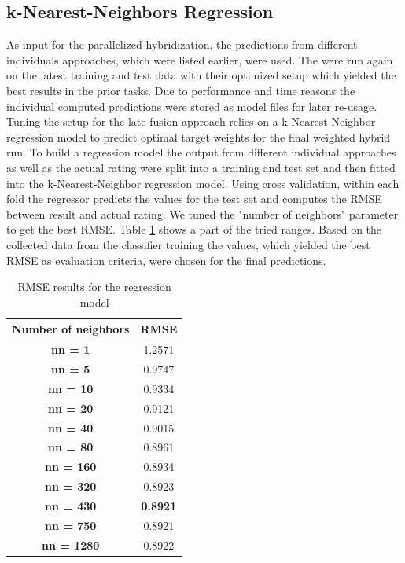 \documentclass{sigish}
\begin{document}
\subsection{k-Nearest-Neighbors Regression}
As input for the parallelized hybridization, the predictions from different individuals approaches, which were listed earlier, were used. The were run again on the latest training and test data with their optimized setup which yielded the best results in the prior tasks. Due to performance and time reasons the individual computed predictions were stored as model files for later re-usage. Tuning the setup for the late fusion approach relies on a k-Nearest-Neighbor regression model to predict optimal target weights for the final weighted hybrid run. To build a regression model the output from different individual approaches as well as the actual rating were split into a training and test set and then fitted into the k-Nearest-Neighbor regression model. Using cross validation, within each fold the regressor predicts the values for the test set and computes the RMSE between result and actual rating. We tuned the "number of neighbors" parameter to get the best RMSE. Table \ref{tab:regrRMSE} shows a part of the tried ranges. Based on the collected data from the classifier training the values, which yielded the best RMSE as evaluation criteria, were chosen for the final predictions.
\begin{table}
\centering	
	\begin{tabular}{|c|c|}
	\hline
	\textbf{Number of neighbors} & \textbf{RMSE} \\ \hline
	\textbf{nn = 1}  & 1.2571         \\ \hline
	\textbf{nn = 5} & 0.9747         \\ \hline
	\textbf{nn = 10} & 0.9334         \\ \hline
	\textbf{nn = 20} & 0.9121         \\ \hline
	\textbf{nn = 40} & 0.9015         \\ \hline
	\textbf{nn = 80} & 0.8961         \\ \hline
	\textbf{nn = 160} & 0.8934         \\ \hline
	\textbf{nn = 320} & 0.8923         \\ \hline
	\textbf{nn = 430} & \textbf{0.8921}         \\ \hline
	\textbf{nn = 750} & 0.8921         \\ \hline
	\textbf{nn = 1280} & 0.8922         \\ \hline
	\end{tabular}
	\caption{RMSE results for the regression model}
	\label{tab:regrRMSE}
\end{table}
\end{document}
